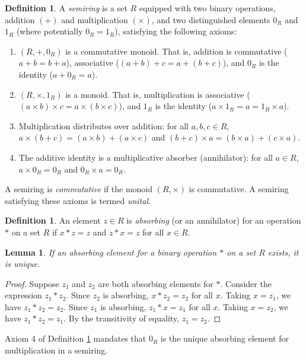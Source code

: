 \documentclass[11pt, a4paper]{article}
\theoremstyle{plain}
\newtheorem{lemma}[theorem]{Lemma}
\theoremstyle{definition}
\newtheorem{definition}[theorem]{Definition}
\numberwithin{equation}{section}
\begin{document}
\begin{definition}\label{def:semiring}
A \emph{semiring} is a set $R$ equipped with two binary operations, addition $(+)$ and multiplication $(\times)$, and two distinguished elements $0_R$ and $1_R$ (where potentially $0_R=1_R$), satisfying the following axioms:
\begin{enumerate}
    \item $(R, +, 0_R)$ is a commutative monoid. That is, addition is commutative ($a+b=b+a$), associative ($(a+b)+c=a+(b+c)$), and $0_R$ is the identity ($a+0_R=a$).
    \item $(R, \times, 1_R)$ is a monoid. That is, multiplication is associative ($(a\times b)\times c=a\times(b\times c)$), and $1_R$ is the identity ($a\times 1_R=a=1_R\times a$).
    \item Multiplication distributes over addition: for all $a, b, c \in R$,
    $a\times(b+c) = (a\times b) + (a\times c)$ and $(b+c)\times a = (b\times a) + (c\times a)$.
    \item The additive identity is a multiplicative absorber (annihilator): for all $a \in R$, $a \times 0_R = 0_R$ and $0_R \times a = 0_R$.
\end{enumerate}
A semiring is \emph{commutative} if the monoid $(R, \times)$ is commutative. A semiring satisfying these axioms is termed \emph{unital}.
\end{definition}

\begin{definition}
An element $z \in R$ is \emph{absorbing} (or an annihilator) for an operation $*$ on a set $R$ if $x*z = z$ and $z*x = z$ for all $x \in R$.
\end{definition}

\begin{lemma}\label{lem:unique_absorber}
If an absorbing element for a binary operation $*$ on a set $R$ exists, it is unique.
\end{lemma}
\begin{proof}
Suppose $z_1$ and $z_2$ are both absorbing elements for $*$. Consider the expression $z_1 * z_2$.
Since $z_2$ is absorbing, $x*z_2=z_2$ for all $x$. Taking $x=z_1$, we have $z_1 * z_2 = z_2$.
Since $z_1$ is absorbing, $z_1*x=z_1$ for all $x$. Taking $x=z_2$, we have $z_1 * z_2 = z_1$.
By the transitivity of equality, $z_1 = z_2$.
\end{proof}

Axiom 4 of Definition \ref{def:semiring} mandates that $0_R$ is the unique absorbing element for multiplication in a semiring.
\end{document}
